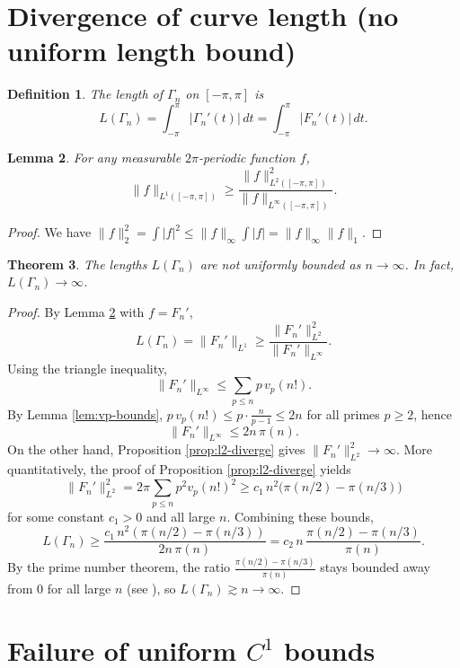 \documentclass[11pt]{article}
\theoremstyle{plain}
\newtheorem{theorem}{Theorem}[section]
\newtheorem{lemma}[theorem]{Lemma}
\newtheorem{definition}[theorem]{Definition}
\begin{document}
\section{Divergence of curve length (no uniform length bound)}\label{sec:length}

\begin{definition}
The length of $\Gamma_n$ on $[-\pi,\pi]$ is
\[
L(\Gamma_n)=\int_{-\pi}^{\pi}|\Gamma_n'(t)|\,dt=\int_{-\pi}^{\pi}|F_n'(t)|\,dt.
\]
\end{definition}

\begin{lemma}\label{lem:l1-l2-linf}
For any measurable $2\pi$-periodic function $f$,
\[
\|f\|_{L^1([-\pi,\pi])}\ge \frac{\|f\|_{L^2([-\pi,\pi])}^2}{\|f\|_{L^\infty([-\pi,\pi])}}.
\]
\end{lemma}

\begin{proof}
We have $\|f\|_2^2=\int |f|^2 \le \|f\|_\infty\int |f|=\|f\|_\infty\|f\|_1$.
\end{proof}

\begin{theorem}\label{thm:length}
The lengths $L(\Gamma_n)$ are not uniformly bounded as $n\to\infty$. In fact, $L(\Gamma_n)\to\infty$.
\end{theorem}

\begin{proof}
By Lemma \ref{lem:l1-l2-linf} with $f=F_n'$,
\[
L(\Gamma_n)=\|F_n'\|_{L^1}\ge \frac{\|F_n'\|_{L^2}^2}{\|F_n'\|_{L^\infty}}.
\]
Using the triangle inequality,
\[
\|F_n'\|_{L^\infty}
\le \sum_{p\le n} p\,v_p(n!).
\]
By Lemma \ref{lem:vp-bounds}, $p\,v_p(n!)\le p\cdot \frac{n}{p-1}\le 2n$ for all primes $p\ge 2$, hence
\[
\|F_n'\|_{L^\infty}\le 2n\,\pi(n).
\]
On the other hand, Proposition \ref{prop:l2-diverge} gives $\|F_n'\|_{L^2}^2\to\infty$.
More quantitatively, the proof of Proposition \ref{prop:l2-diverge} yields
\[
\|F_n'\|_{L^2}^2
=2\pi\sum_{p\le n} p^2 v_p(n!)^2
\ge c_1\,n^2\big(\pi(n/2)-\pi(n/3)\big)
\]
for some constant $c_1>0$ and all large $n$.
Combining these bounds,
\[
L(\Gamma_n)\ge
\frac{c_1\,n^2(\pi(n/2)-\pi(n/3))}{2n\,\pi(n)}
=
c_2\,n\,\frac{\pi(n/2)-\pi(n/3)}{\pi(n)}.
\]
By the prime number theorem, the ratio $\frac{\pi(n/2)-\pi(n/3)}{\pi(n)}$ stays bounded away from $0$ for all large $n$ (see \cite{Montgomery1994}), so $L(\Gamma_n)\gtrsim n\to\infty$.
\end{proof}

\section{Failure of uniform $C^1$ bounds}\label{sec:C1}
\end{document}
